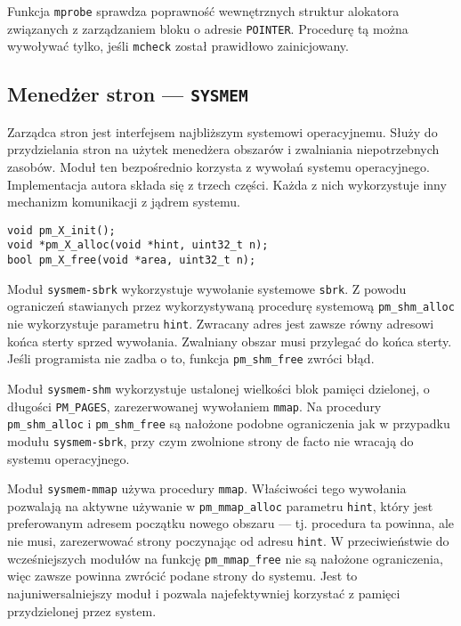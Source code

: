 \documentclass[12pt,a4paper,titlepage,twoside]{mwart}
\begin{document}
Funkcja \texttt{mprobe} sprawdza poprawność wewnętrznych struktur alokatora
związanych z zarządzaniem bloku o adresie \texttt{POINTER}. Procedurę tą można
wywoływać tylko, jeśli \texttt{mcheck} został prawidłowo zainicjowany.

\newpage

\subsection{Menedżer stron --- \texttt{SYSMEM}}

Zarządca stron jest interfejsem najbliższym systemowi operacyjnemu. Służy do
przydzielania stron na użytek menedżera obszarów i zwalniania niepotrzebnych
zasobów. Moduł ten bezpośrednio korzysta z wywołań systemu operacyjnego.
Implementacja autora składa się z trzech części. Każda z nich wykorzystuje inny
mechanizm komunikacji z jądrem systemu. 

\vspace{2ex}
\begin{lstlisting}[caption={Prototypy funkcji menedżera stron ($X \in \{sbrk, mmap, shm\}$).}]
void pm_X_init();
void *pm_X_alloc(void *hint, uint32_t n);
bool pm_X_free(void *area, uint32_t n);
\end{lstlisting}

Moduł \texttt{sysmem-sbrk} wykorzystuje wywołanie systemowe \texttt{sbrk}. Z
powodu ograniczeń stawianych przez wykorzystywaną procedurę systemową
\texttt{pm\_shm\_alloc} nie wykorzystuje parametru \texttt{hint}. Zwracany
adres jest zawsze równy adresowi końca sterty sprzed wywołania. Zwalniany
obszar musi przylegać do końca sterty. Jeśli programista nie zadba o to,
funkcja \texttt{pm\_shm\_free} zwróci błąd.

Moduł \texttt{sysmem-shm} wykorzystuje ustalonej wielkości blok pamięci
dzielonej, o długości \texttt{PM\_PAGES}, zarezerwowanej wywołaniem
\texttt{mmap}. Na procedury \texttt{pm\_shm\_alloc} i \texttt{pm\_shm\_free} są
nałożone podobne ograniczenia jak w przypadku modułu \texttt{sysmem-sbrk}, przy
czym zwolnione strony de facto nie wracają do systemu operacyjnego.

Moduł \texttt{sysmem-mmap} używa procedury \texttt{mmap}. Właściwości tego
wywołania pozwalają na aktywne używanie w \texttt{pm\_mmap\_alloc} parametru
\texttt{hint}, który jest preferowanym adresem początku nowego obszaru --- tj.
procedura ta powinna, ale nie musi, zarezerwować strony poczynając od adresu
\texttt{hint}. W przeciwieństwie do wcześniejszych modułów na funkcję
\texttt{pm\_mmap\_free} nie są nałożone ograniczenia, więc zawsze powinna
zwrócić podane strony do systemu. Jest to najuniwersalniejszy moduł i pozwala
najefektywniej korzystać z pamięci przydzielonej przez system.
\end{document}
